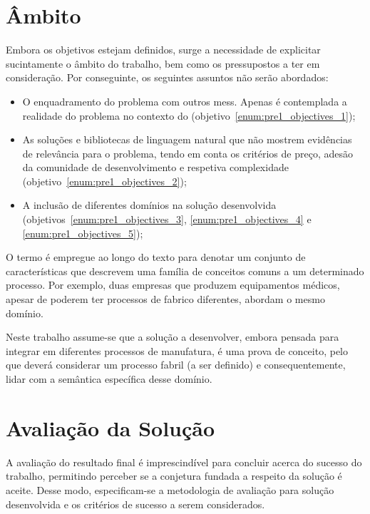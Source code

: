 \section{Âmbito}

Embora os objetivos estejam definidos, surge a necessidade de explicitar sucintamente o âmbito do trabalho, bem como os pressupostos a ter em consideração. Por conseguinte, os seguintes assuntos não serão abordados:

\begin{itemize}
    \item
    {
        O enquadramento do problema com outros \glspl{mes}. Apenas é contemplada a realidade do problema no contexto do {\productname} (objetivo~\ref{enum:pre1_objectives_1});
    }
    \item
    {
        As soluções e bibliotecas de linguagem natural que não mostrem evidências de relevância para o problema, tendo em conta os critérios de preço, adesão da comunidade de desenvolvimento e respetiva complexidade (objetivo~\ref{enum:pre1_objectives_2});
    }
    \item 
    {
        A inclusão de diferentes domínios na solução desenvolvida (objetivos~\ref{enum:pre1_objectives_3}, \ref{enum:pre1_objectives_4} e \ref{enum:pre1_objectives_5});
    }
\end{itemize}

O termo  é empregue ao longo do texto para denotar um conjunto de características que descrevem uma família de conceitos comuns a um determinado processo. Por exemplo, duas empresas que produzem equipamentos médicos, apesar de poderem ter processos de fabrico diferentes, abordam o mesmo domínio.

Neste trabalho assume-se que a solução a desenvolver, embora pensada para integrar em diferentes processos de manufatura, é uma prova de conceito, pelo que deverá considerar um processo fabril (a ser definido) e consequentemente, lidar com a semântica específica desse domínio.

\section{Avaliação da Solução}
\label{sec:pre1_solutionevaluation}

A avaliação do resultado final é imprescindível para concluir acerca do sucesso do trabalho, permitindo perceber se a conjetura fundada a respeito da solução é aceite. Desse modo, especificam-se a metodologia de avaliação para solução desenvolvida e os critérios de sucesso a serem considerados.

